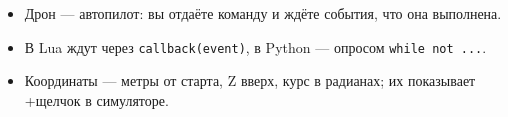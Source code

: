 \begin{infobox}
\begin{itemize}
    \item Дрон --- автопилот: вы отдаёте команду и ждёте события, что она выполнена.
    \item В Lua ждут через \texttt{callback(event)}, в Python --- опросом \texttt{while not ...}.
    \item Координаты --- метры от старта, Z вверх, курс в радианах; их показывает +щелчок в симуляторе.
\end{itemize}
\end{infobox}
